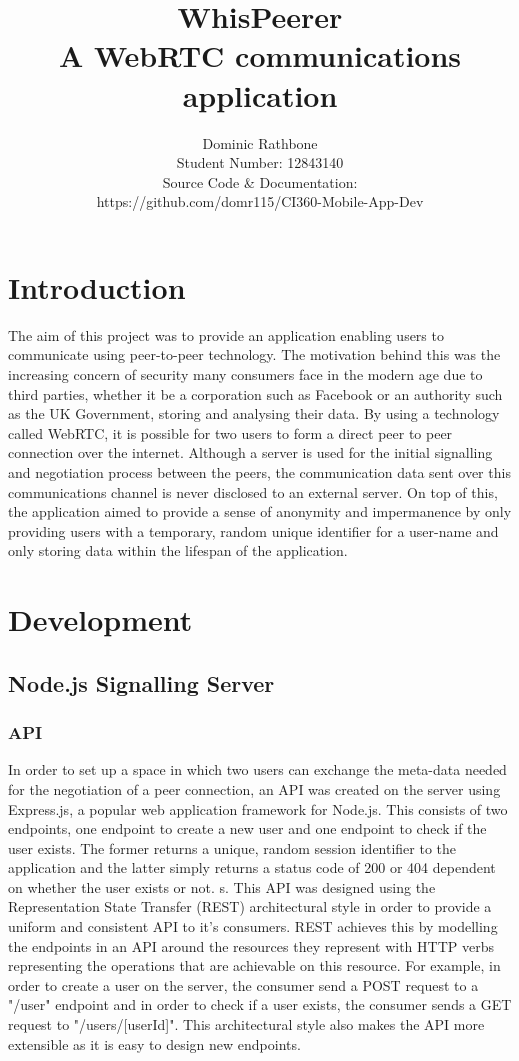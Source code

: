 \documentclass[]{report}
\title{WhisPeerer \\A WebRTC communications application}
\author{Dominic Rathbone \\ Student Number: 12843140 \\ Source Code \& Documentation: \\ https://github.com/domr115/CI360-Mobile-App-Dev}
\begin{document}
\maketitle

\tableofcontents

\chapter{Introduction}
The aim of this project was to provide an application enabling users to communicate using peer-to-peer technology. The motivation behind this was the increasing concern of security many consumers face in the modern age due to third parties, whether it be a corporation such as Facebook or an authority such as the UK Government, storing and analysing their data. By using a technology called WebRTC, it is possible for two users to form a direct peer to peer connection over the internet.  Although a server is used for the initial signalling and negotiation process between the peers, the communication data sent over this communications channel is never disclosed to an external server. On top of this, the application aimed to provide a sense of anonymity and impermanence by only providing users with a temporary, random unique identifier for a user-name and only storing data within the lifespan of the application.

	\chapter{Development}
		\section{Node.js Signalling Server}
			\subsection{API}
			In order to set up a space in which two users can exchange the meta-data needed for the negotiation of a peer connection, an API was created on the server using Express.js, a popular web application framework for Node.js. This consists of two endpoints, one endpoint to create a new user and one endpoint to check if the user exists. The former returns a unique, random session identifier to the application and the latter simply returns a status code of 200 or 404 dependent on whether the user exists or not. s. This API was designed using the Representation State Transfer (REST) architectural style in order to provide a uniform and consistent API to it's consumers. REST achieves this by modelling the endpoints in an API around the resources they represent with HTTP verbs representing the operations that are achievable on this resource. For example, in order to create a user on the server, the consumer send a POST request to a "/user" endpoint and in order to check if a user exists, the consumer sends a GET request to "/users/[userId]". This architectural style also makes the API more extensible as it is easy to design new endpoints.
			
\end{document}
